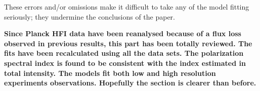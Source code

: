 \documentclass[12pt]{article}
\begin{document}
\begin{enumerate}
These errors and/or omissions make it difficult to take any of the
model fitting seriously; they undermine the conclusions of the paper.

\textbf{Since Planck HFI data have been reanalysed because of a flux loss observed in previous results, this part has been totally reviewed. The fits have been recalculated using all the data sets. The polarization spectral index is found to be consistent with the index estimated in total intensity. The models fit both low and high resolution experiments observations. Hopefully the section is clearer than before.}

\end{enumerate}
\end{document}
